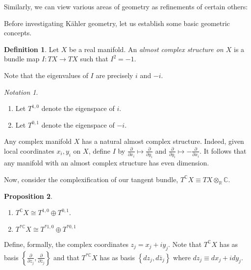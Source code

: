 \documentclass[10pt,letterpaper,cm]{nupset}
\theoremstyle{definition}
\newtheorem{defn}{Definition}[subsection]
\theoremstyle{theorem}
\newtheorem{prop}[defn]{Proposition}
\theoremstyle{remark}
\newtheorem*{notation}{Notation}
\newcommand{\C}{\mathbb C}
\newcommand{\R}{\mathbb{R}}
\newcommand{\1}{\mathbb{1}}
\newcommand{\0}{\vec 0}
\newcommand{\be}{\begin{enumerate}}
\newcommand{\ee}{\end{enumerate}}
\begin{document}
Similarly, we can view various areas of geometry as refinements of certain others:

\begin{center}
\end{center}

Before investigating K\"ahler geometry, let us establish some basic geometric concepts.

\begin{defn}
Let  $X$ be a real manifold. An \textit{almost complex structure on $X$} is a bundle map $I : T{X} \to T{X}$ such that $I^2 = {-1}$.
\end{defn}

Note that the eigenvalues of $I$ are precisely $i$ and ${-i}$.

\begin{notation} $ $
\be
\item Let $T^{1,0}$ denote the eigenspace of $i$.
\item  Let $T^{0,1}$ denote the eigenspace of ${-i}$.
\ee
\end{notation}

Any complex manifold $X$ has a natural almost complex structure. Indeed, given local coordinates $x_i, y_i$ on $X$, define $I$ by $\frac{\partial}{\partial{x_i}} \mapsto \frac{\partial}{\partial{y_i}}$ and $\frac{\partial}{\partial{y_i}} \mapsto {-\frac{\partial}{\partial{x_i}}}$. It follows that any manifold with an almost complex structure has even dimension.

\medskip

Now, consider the  complexification of our tangent bundle, $T^{\C}{X} \equiv T{X} \otimes_{\R}\C$.  

\begin{prop} $ $
\be
\item $T^{\C}{X} \cong T^{1,0} \oplus T^{0,1}$.
\item $T^{\ast{\C}}{X} \cong T^{\ast{1,0}}\oplus T^{\ast{0,1}}$
\ee
\end{prop}

Define, formally, the complex coordinates $z_j = x_j + iy_j$. Note that $T^{\C}{X}$ has as basis $\left\{\frac{\partial}{\partial{z_j}}, \frac{\partial}{\partial{\bar{z}_j}}\right\}$ and that $T^{\ast{\C}}{X}$ has as basis $\left\{d{z_j}, d{\bar{z}_j}\right\}$ where $d{z_j} \equiv d{x_j} + id{y_j}$.
\end{document}
